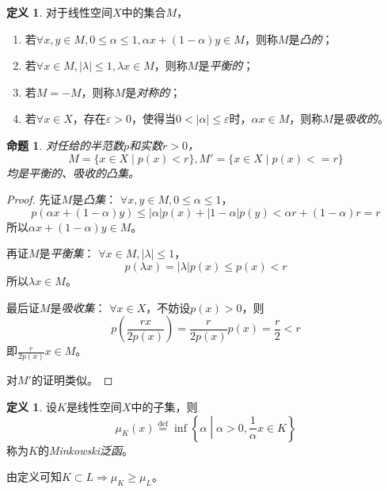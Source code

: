 \documentclass[winfonts,UTF8,c5size,a4paper,fancyhdr,hyperref,titlepage,nocap]{ctexart}
\theoremstyle{question}
\theoremstyle{theorem}
\newtheorem{prop}[thm]{命题}
\theoremstyle{definition}
\newtheorem{defn}[thm]{定义}
\theoremstyle{remark}
\numberwithin{equation}{subsection}
\newcommand{\red}{\color{red}}
\newcommand{\defeq}{\stackrel{{\mathrm{def}}}{=}}
\begin{document}
\begin{defn}
  对于线性空间$X$中的集合$M$，
\begin{enumerate}[1)]
    \setlength{\itemindent}{2ex}
    \item 若$\forall x,y\in M, 0\leqslant\alpha\leqslant1, \alpha x+(1-\alpha)y\in M$，则称$M$是\emph{\red 凸的}；
    \item 若$\forall x\in M,|\lambda|\leqslant1, \lambda x\in M$，则称$M$是\emph{\red 平衡的}；
    \item 若$M=-M$，则称$M$是\emph{\red 对称的}；
    \item 若$\forall x\in X$，存在$\varepsilon>0$，使得当$0<|\alpha|\leqslant\varepsilon$时，$\alpha x\in M$，则称$M$是\emph{\red 吸收的}。
\end{enumerate}
\end{defn}

\begin{prop}\label{M1}
  对任给的半范数$p$和实数$r>0$，
\begin{equation*}
M=\{x\in X\mid p(x)<r\},
M'=\{x\in X\mid p(x)<= r\}
\end{equation*}
均是平衡的、吸收的凸集。
\end{prop}
\begin{proof}
  先证$M$是\emph{凸集}：
  $\forall x,y\in M, 0\leqslant\alpha\leqslant1$，
  \begin{equation*}
  p(\alpha x+(1-\alpha)y)\leqslant|\alpha|p(x)+|1-\alpha|p(y)<\alpha r+(1-\alpha)r=r
  \end{equation*}
  所以$\alpha x+(1-\alpha)y\in M$。

  再证$M$是\emph{平衡集}：
  $\forall x\in M,|\lambda|\leqslant1$，
  \begin{equation*}
  p(\lambda x)=|\lambda|p(x)\leqslant p(x)<r
  \end{equation*}
  所以$\lambda x\in M$。

  最后证$M$是\emph{吸收集}：
  $\forall x\in X$，不妨设$p(x)>0$，则
  \begin{equation*}
  p(\frac{rx}{2p(x)})=\frac{r}{2p(x)}p(x)=\frac{r}{2}<r
  \end{equation*}
  即$\frac{r}{2p(x)}x\in M$。

  对$M'$的证明类似。
\end{proof}

\begin{defn}
  设$K$是线性空间$X$中的子集，则
  \begin{equation*}
    \mu_K(x)\defeq\inf\left\{\alpha\middle|\alpha>0,\frac{1}{\alpha}x\in K\right\}
  \end{equation*}
  称为$K$的\emph{\red Minkowski泛函}。
\end{defn}
由定义可知$K\subset L\Rightarrow\mu_K\geqslant\mu_L$。
\end{document}
